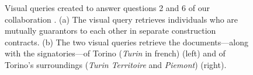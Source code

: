\begin{figure}[!ht]
    \caption{Visual queries created to answer questions 2 and 6 of our collaboration \pascal. (a) The visual query retrieves individuals who are mutually guarantors to each other in separate construction contracts.
        (b) The two visual queries retrieve the documents---along with the signatories---of Torino (\textit{Turin} in french) (left) and of Torino's surroundings (\textit{Turin Territoire} and \textit{Piemont}) (right).}\label{fig:visualQueriesExamples}
\end{figure}


%
%



